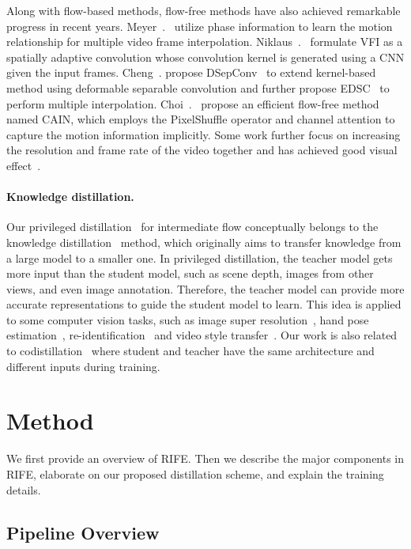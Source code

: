\documentclass[final]{cvpr}
\begin{document}
Along with flow-based methods, flow-free methods have also achieved remarkable progress in recent years. Meyer~\etal.~\cite{meyer2015phase,meyer2018phasenet} utilize phase information to learn the motion relationship for multiple video frame interpolation. Niklaus~\etal.~\cite{niklaus2017video, Niklaus_ICCV_2017} formulate VFI as a spatially adaptive convolution whose convolution kernel is generated using a CNN given the input frames. Cheng~\etal. propose DSepConv~\cite{cheng2020video} to extend kernel-based method using deformable separable convolution and further propose EDSC~\cite{cheng2020multiple} to perform multiple interpolation. Choi~\etal.~\cite{choi2020channel} propose an efficient flow-free method named CAIN, which employs the PixelShuffle operator and channel attention to capture the motion information implicitly. Some work further 
focus on increasing the resolution and frame rate of the video together and has achieved good visual effect~\cite{xiang2020zooming, xu2021temporal}.

\paragraph{Knowledge distillation.} Our privileged distillation~\cite{lopez2015unifying} for intermediate flow conceptually belongs to the knowledge distillation~\cite{hinton2015distilling} method, which originally aims to transfer knowledge from a large model to a smaller one. In privileged distillation, the teacher model gets more input than the student model, such as scene depth, images from other views, and even image annotation. Therefore, the teacher model can provide more accurate representations to guide the student model to learn. This idea is applied to some computer vision tasks, such as image super resolution~\cite{lee2020learning}, hand pose estimation~\cite{yuan2018rgb}, re-identification~\cite{porrello2020robust} and video style transfer~\cite{chen2020optical}. Our work is also related to codistillation~\cite{anil2018large} where student and teacher have the same architecture and different inputs during training. 	\section{Method}

We first provide an overview of RIFE. Then we describe the major components in RIFE, elaborate on our proposed distillation scheme, and explain the training details. 

\subsection{Pipeline Overview}
\label{subsec:overview}
\end{document}
